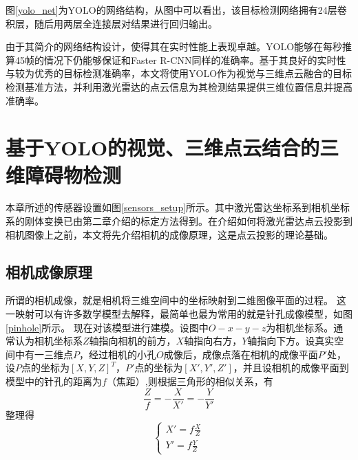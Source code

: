 
图\ref{yolo_net}为YOLO的网络结构，从图中可以看出，该目标检测网络拥有24层卷积层，随后用两层全连接层对结果进行回归输出。

由于其简介的网络结构设计，使得其在实时性能上表现卓越。YOLO能够在每秒推算45帧的情况下仍能够保证和Faster R-CNN同样的准确率。基于其良好的实时性与较为优秀的目标检测准确率，本文将使用YOLO作为视觉与三维点云融合的目标检测基准方法，并利用激光雷达的点云信息为其检测结果提供三维位置信息并提高准确率。

\section{基于YOLO的视觉、三维点云结合的三维障碍物检测}
本章所述的传感器设置如图\ref{sensors_setup}所示。其中激光雷达坐标系到相机坐标系的刚体变换已由第二章介绍的标定方法得到。在介绍如何将激光雷达点云投影到相机图像上之前，本文将先介绍相机的成像原理，这是点云投影的理论基础。


\subsection{相机成像原理}

所谓的相机成像，就是相机将三维空间中的坐标映射到二维图像平面的过程。
这一映射可以有许多数学模型去解释，最简单也最为常用的就是针孔成像模型，如图\ref{pinhole}所示。
现在对该模型进行建模。设图中$O-x-y-z$为相机坐标系。通常认为相机坐标系$Z$轴指向相机的前方，$X$轴指向右方，$Y$轴指向下方。设真实空间中有一三维点$P$，经过相机的小孔$O$成像后，成像点落在相机的成像平面$P'$处，设$P$点的坐标为$[X, Y, Z]^T$，$P'$点的坐标为$[X', Y', Z']$，并且设相机的成像平面到模型中的针孔的距离为$f$（焦距）,则根据三角形的相似关系，有
\begin{equation}
    \frac{Z}{f}=-\frac{X}{X'}=-\frac{Y}{Y'}
\end{equation}
整理得
\begin{equation}
\left\{
    \begin{split}
        X'=f\frac{X}{Z} \\
        Y'=f\frac{Y}{Z}  
    \end{split}
\right.
\label{eq:pinhole}
\end{equation}

